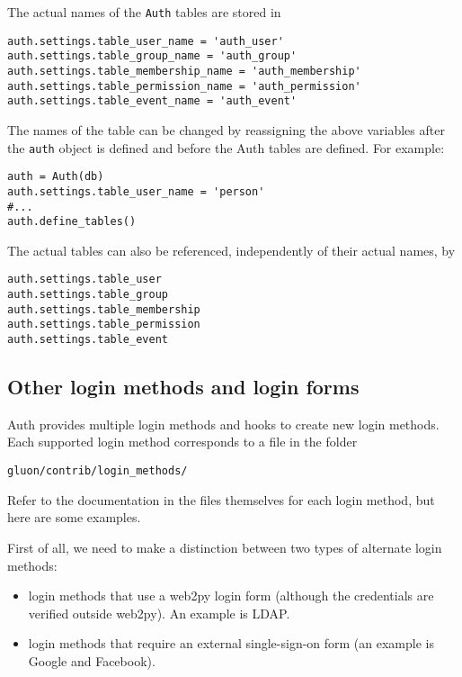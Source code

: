 \documentclass[justified,sixbynine,notoc]{tufte-book}
\def\ft{\small\tt}
\def\inxx#1{\index{#1}}
\begin{document}
\begin{fullwidth}
The actual names of the {\ft Auth} tables are stored in
\begin{lstlisting}
auth.settings.table_user_name = 'auth_user'
auth.settings.table_group_name = 'auth_group'
auth.settings.table_membership_name = 'auth_membership'
auth.settings.table_permission_name = 'auth_permission'
auth.settings.table_event_name = 'auth_event'
\end{lstlisting}

The names of the table can be changed by reassigning the above variables after the {\ft auth} object is defined and before the Auth tables are defined. For example:
\begin{lstlisting}
auth = Auth(db)
auth.settings.table_user_name = 'person'
#...
auth.define_tables()
\end{lstlisting}

The actual tables can also be referenced, independently of their actual names, by
\begin{lstlisting}
auth.settings.table_user
auth.settings.table_group
auth.settings.table_membership
auth.settings.table_permission
auth.settings.table_event
\end{lstlisting}

\goodbreak\subsection{Other login methods and login forms}

\inxx{LDAP} \inxx{PAM}

Auth provides multiple login methods and hooks to create new login methods. Each supported login method corresponds to a file in the folder
\begin{lstlisting}
gluon/contrib/login_methods/
\end{lstlisting}

Refer to the documentation in the files themselves for each login method, but here are some examples.

First of all, we need to make a distinction between two types of alternate login methods:
\begin{itemize}
\item login methods that use a web2py login form (although the credentials are verified outside web2py). An example is LDAP.

\item login methods that require an external single-sign-on form (an example is Google and Facebook).
\end{itemize}


\end{fullwidth}
\end{document}
